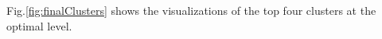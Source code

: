 Fig.\ref{fig:finalClusters} shows the visualizations of the top four clusters at the optimal level.
% 
%    
